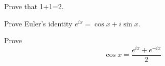 \documentclass[USLetter,11pt]{report}
\newif\ifanswers
\begin{document}
\begin{hwprob}
    Prove that 1+1=2.
\end{hwprob}

\ifanswers
\begin{hwsoln}
    See Russell \& Whitehead, {\it Principia Mathematica}.
\end{hwsoln}
\fi

\begin{hwprob}
    Prove Euler's identity $e^{ix}=\cos x+ i \sin x.$
\end{hwprob}

\ifanswers
\begin{hwsoln}
    \lipsum[1-3]
\end{hwsoln}
\fi

\begin{hwprob}
    Prove $$\cos x = \frac{e^{ix}+e^{-ix}}{2}$$
\end{hwprob}

\ifanswers
\begin{hwsoln}
    \lipsum[4-5]
\end{hwsoln}
\fi
\end{document}
